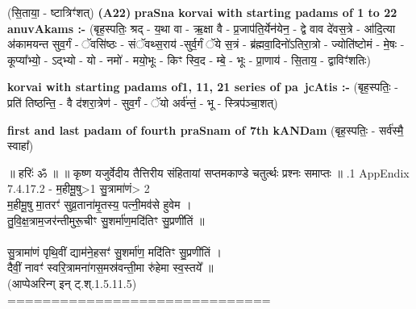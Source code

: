 \documentclass[17pt]{extarticle}
\begin{document}
                  \newline
                      (सि॒ताया॒ - ष्टात्रिꣳ॑शत्)  \textbf{(A22)} \newline \newline
\textbf{praSna korvai with starting padams of 1 to 22 anuvAkams :-} \newline
(बृह॒स्पतिः॒ श्रद् - य॒था वा - ऋ॒क्षा वै - प्र॒जाप॑ति॒र्येन॑येन॒ - द्वे वाव दे॑वस॒त्रे - आ॑दि॒त्या अ॑कामयन्त सुव॒र्गं - ॅवसि॑ष्ठः - संॅवथ्स॒राय॑ -सुर्व॒र्गं ॅये स॒त्रं - ब्र॑ह्मवा॒दिनो॑ऽतिरा॒त्रो - ज्योति॑ष्टोमं - मे॒षः - कूप्या᳚भ्यो॒ - ऽद्भ्यो - यो - नमो॑ - मयो॒भूः - किꣳ स्वि॒द - म्बे॒ - भूः - प्रा॒णाय॑ - सि॒ताय॒ - द्वाविꣳ॑शतिः) \newline

\textbf{korvai with starting padams of1, 11, 21 series of pa~jcAtis :-} \newline
(बृह॒स्पतिः॒ - प्रति॑ तिष्ठन्ति॒ - वै द॑शरा॒त्रेण॑ - सुव॒र्गं - ॅयो अर्व॑न्तं॒ - भू - स्त्रिप॑ञ्चा॒शत्) \newline

\textbf{first and last padam of fourth praSnam of 7th kANDam} \newline
(बृह॒स्पतिः॒ - सर्व॑स्मै॒ स्वाहा᳚) \newline 


॥ हरिः॑ ॐ ॥
॥ कृष्ण यजुर्वेदीय तैत्तिरीय संहितायां सप्तमकाण्डे चतुर्त्थः प्रश्नः समाप्तः ॥ \newline
{}.1   AppEndix\\7.4.17.2 - म॒हीमू॒षु>1 सु॒त्रामा॑णं> 2 \\म॒हीमू॒षु मा॒तरꣳ॑ सुव्र॒ताना॑मृ॒तस्य॒ पत्नी॒मव॑से हुवेम । \\तु॒वि॒क्ष॒त्राम॒जर॑न्तीमुरू॒चीꣳ सु॒शर्मा॑ण॒मदि॑तिꣳ सु॒प्रणी॑तिं ॥ \\\\सु॒त्रामा॑णं पृथि॒वीं द्याम॑ने॒हसꣳ॑ सु॒शर्मा॑ण॒ मदि॑तिꣳ सु॒प्रणी॑तिं । \\दैवीं॒ नावꣳ॑ स्वरि॒त्रामना॑गस॒मस्र॑वन्ती॒मा रु॑हेमा स्व॒स्तये᳚ ॥ \\(आप्पेअरिन्ग् इन् ट्.श्.1.5.11.5)\\==============================\\
\pagebreak
        
\end{document}
